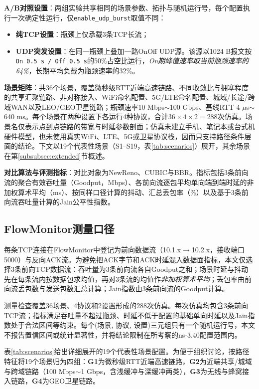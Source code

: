 \documentclass[10pt,twocolumn]{article}
\begin{document}
\textbf{A/B对照设置}：两组实验共享相同的场景参数、拓扑与随机运行号，每个配置执行一次确定性运行，仅\texttt{enable\_udp\_burst}取值不同：
\begin{itemize}
\item \textbf{纯TCP设置}：瓶颈上仅承载3条TCP长流；
\item \textbf{UDP突发设置}：在同一瓶颈上叠加一路OnOff UDP源。该源以1024 B报文按\texttt{On 0.5 s / Off 0.5 s}的50\%占空比运行，\emph{On期峰值速率取当前瓶颈速率的64\%}，长期平均负载为瓶颈速率的32\%。
\end{itemize}

\textbf{场景矩阵}：共36个场景，覆盖微秒级RTT近端高速链路、不同收敛比与拥塞程度的共享汇聚链路、非对称接入、WiFi命名配置、5G/LTE命名配置、城域/长途/跨域WAN以及LEO/GEO卫星链路；瓶颈速率10 Mbps$\sim$100 Gbps、基线RTT 4 $\mu$s$\sim$640 ms。每个场景在两种设置下各运行4种协议，合计$36\times4\times2=288$次仿真。场景名仅表示点到点链路的带宽与时延参数剖面；仿真未建立手机、笔记本或台式机硬件模型，也未使用真实WiFi、LTE、5G或卫星协议栈，因而只支持路径条件层面的结论。下文以19个代表性场景（S1--S19，表\ref{tab:scenarios}）展开，其余场景在第\ref{subsubsec:extended}节概述。

\textbf{对比算法与评测指标}：对比对象为NewReno\cite{newreno}、CUBIC\cite{cubic}与BBR\cite{bbr}。指标包括3条前向流的聚合有效吞吐量（Goodput，Mbps）、各前向流逐包平均单向端到端时延的非加权算术平均（ms）、按同样口径计算的抖动、汇总丢包率（\%）以及基于3条前向流吞吐量计算的Jain公平性指数\cite{fairness}。

\subsection{FlowMonitor测量口径}
\label{subsec:data-audit}

每条TCP连接在FlowMonitor中登记为前向数据流（10.1.x$\rightarrow$10.2.x，接收端口5000）与反向ACK流。为避免把ACK字节和ACK时延混入数据面指标，本文仅选择3条前向TCP数据流：吞吐量为3条前向流各自Goodput之和；场景时延与抖动先在每条流内按数据包求均值，再对3条流的均值作\emph{非加权算术平均}；丢包率由前向流丢包数与发送包数汇总计算；Jain指数由3条前向流的Goodput计算。

测量检查覆盖36场景、4协议和2设置形成的288次仿真。每次仿真均包含3条前向TCP流；指标满足吞吐量不超过瓶颈、时延不低于配置的基础单向时延以及Jain指数处于合法区间等约束。每个(场景, 协议, 设置)三元组只有一个随机运行号，本文不报告置信区间或统计显著性，并将结论限制在所考察的ns-3.40配置范围内。

表\ref{tab:scenarios}给出详细展开的19个代表性场景配置。为便于组织讨论，按路径特征将19个场景归为四组：\textbf{G1}为微秒级RTT近端高速链路，\textbf{G2}为近端共享/城域与跨域链路（100 Mbps$\sim$1 Gbps，含浅缓冲与深缓冲两类），\textbf{G3}为无线与蜂窝接入链路，\textbf{G4}为GEO卫星链路。
\end{document}
